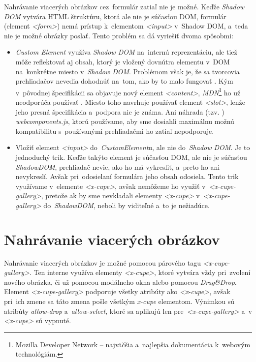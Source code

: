 Nahrávanie viacerých obrázkov cez~formulár zatiaľ nie je možné. Keďže \emph{Shadow DOM} vytvára HTML štruktúru, ktorá ale nie je súčasťou DOM, formulár (element \emph{<form>}) nemá prístup k~elementom \emph{<input>} v~Shadow DOM, a~teda nie je možné obrázky poslať. Tento problém sa dá vyriešiť dvoma spôsobmi:

\begin{itemize}
	\item \emph{Custom Element} využíva \emph{Shadow DOM} na~internú reprezentáciu, ale tiež môže reflektovať aj obsah, ktorý je vložený dovnútra elementu v~DOM na~konkrétne miesto v~\emph{Shadow DOM}. Problémom však je, že sa tvorcovia prehliadačov nevedia dohodnúť na~tom, ako by to malo fungovať \cite{WebComponents_state}. Kým v~pôvodnej špecifikácii sa objavuje nový element \emph{<content>}, \emph{MDN}\footnote{Mozilla Developer Network -- najväčšia a~najlepšia dokumentácia k~webovým technológiám.} ho už neodporúča používať \cite{MDN_Content_Element}. Miesto toho navrhuje používať element \emph{<slot>}, lenže jeho presná špecifikácia a~podpora nie je známa. Ani náhrada (tzv. ) \emph{webcomponents.js}, ktorú používame, aby sme dosiahli maximálnu možnú kompatibilitu s~používanými prehliadačmi ho zatiaľ nepodporuje.
	\item Vložiť element \emph{<input>} do~\emph{CustomElement}u, ale nie do~\emph{Shadow DOM}. Je to jednoduchý trik. Keďže takýto element je súčasťou DOM, ale nie je súčasťou \emph{ShadowDOM}, prehliadač nevie, ako ho má vykresliť, a~preto ho ani nevykreslí. Avšak pri~odosielaní formulára jeho obsah odosiela. Tento trik využívame v~elemente \emph{<x-cupe>}, avšak nemôžeme ho využiť v~\emph{<x-cupe-gallery>}, pretože ak by sme nevkladali elementy \emph{<x-cupe>} v~\emph{<x-cupe-gallery>} do~\emph{ShadowDOM}, neboli by viditeľné a~to je nežiadúce.
\end{itemize}


\section{Nahrávanie viacerých obrázkov}

Nahrávanie viacerých obrázkov je možné pomocou párového tagu \emph{<x-cupe-gallery>}. Ten interne využíva elementy \emph{<x-cupe>}, ktoré vytvára vždy pri~zvolení nového obrázka, či už pomocou modálneho okna alebo pomocou \emph{Drag\&Drop}. Element \emph{<x-cupe-gallery>} podporuje všetky atribúty ako \emph{<x-cupe>}, avšak pri~ich zmene sa táto zmena pošle všetkým \emph{x-cupe} elementom. Výnimkou sú atribúty \emph{allow-drop} a~\emph{allow-select}, ktoré sa aplikujú len pre~\emph{<x-cupe-gallery>} a~v \emph{<x-cupe>} sú vypnuté.


